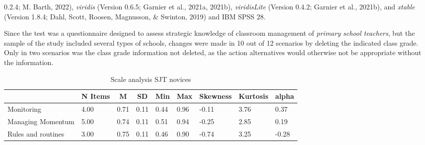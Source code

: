 \documentclass[
  man]{apa6}
\begin{document}
0.2.4; M. Barth, 2022), \emph{viridis} (Version 0.6.5; Garnier et al., 2021a, 2021b), \emph{viridisLite} (Version 0.4.2; Garnier et al., 2021b), and \emph{xtable} (Version 1.8.4; Dahl, Scott, Roosen, Magnusson, \& Swinton, 2019) and IBM SPSS 28.

Since the test was a questionnaire designed to assess strategic knowledge of classroom management of \emph{primary school teachers}, but the sample of the study included several types of schools, changes were made in 10 out of 12 scenarios by deleting the indicated class grade. Only in two scenarios was the class grade information not deleted, as the action alternatives would otherwise not be appropriate without the information.

\begin{table}[h]

\begin{center}
\begin{threeparttable}

\caption{\label{tab:sjt}Scale analysis SJT novices}

\tiny{

\begin{tabular}{lllllllll}
\toprule
 & \multicolumn{1}{c}{N Items} & \multicolumn{1}{c}{M} & \multicolumn{1}{c}{SD} & \multicolumn{1}{c}{Min} & \multicolumn{1}{c}{Max} & \multicolumn{1}{c}{Skewness} & \multicolumn{1}{c}{Kurtosis} & \multicolumn{1}{c}{alpha}\\
\midrule
Monitoring & 4.00 & 0.71 & 0.11 & 0.44 & 0.96 & -0.11 & 3.76 & 0.37\\
Managing Momentum & 5.00 & 0.74 & 0.11 & 0.51 & 0.94 & -0.25 & 2.85 & 0.19\\
Rules and routines & 3.00 & 0.75 & 0.11 & 0.46 & 0.90 & -0.74 & 3.25 & -0.28\\
\bottomrule
\end{tabular}

}

\end{threeparttable}
\end{center}

\end{table}
\end{document}
